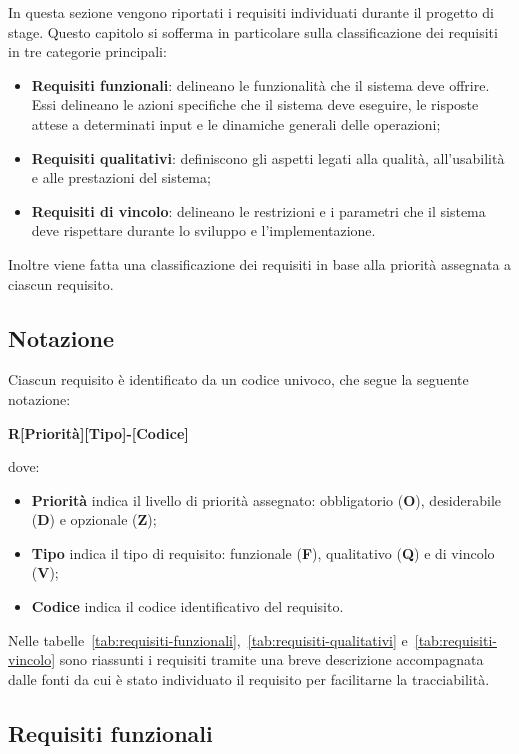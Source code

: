 In questa sezione vengono riportati i requisiti individuati durante il progetto di stage.
Questo capitolo si sofferma in particolare sulla classificazione dei requisiti in tre categorie principali:
\begin{itemize}
    \item \textbf{Requisiti funzionali}: delineano le funzionalità che il sistema deve offrire. Essi delineano le azioni specifiche che il sistema deve eseguire, le risposte attese a determinati input e le dinamiche generali delle operazioni;
    \item\textbf{Requisiti qualitativi}: definiscono gli aspetti legati alla qualità, all'usabilità e alle prestazioni del sistema;
    \item \textbf{Requisiti di vincolo}: delineano le restrizioni e i parametri che il sistema deve rispettare durante lo sviluppo e l'implementazione. 
\end{itemize}

Inoltre viene fatta una classificazione dei requisiti in base alla priorità assegnata a ciascun requisito.

\subsection{Notazione}\label{subsec:notazione}
Ciascun requisito è identificato da un codice univoco, che segue la seguente notazione:
\begin{center}
    \textbf{R[Priorità][Tipo]-[Codice]}
\end{center}
  dove:
  \begin{itemize}
  \item \textbf{Priorità} indica il livello di priorità assegnato: obbligatorio (\textbf{O}), desiderabile (\textbf{D}) e opzionale (\textbf{Z});
  \item \textbf{Tipo} indica il tipo di requisito: funzionale (\textbf{F}), qualitativo (\textbf{Q}) e di vincolo (\textbf{V});
  \item \textbf{Codice} indica il codice identificativo del requisito.
  \end{itemize}

Nelle tabelle~\ref{tab:requisiti-funzionali},~\ref{tab:requisiti-qualitativi} e~\ref{tab:requisiti-vincolo} sono riassunti i requisiti tramite una breve descrizione accompagnata dalle fonti da cui è stato individuato il requisito per
facilitarne la tracciabilità. 

\pagebreak

\subsection{Requisiti funzionali}\label{subsec:requisiti-funzionali}


